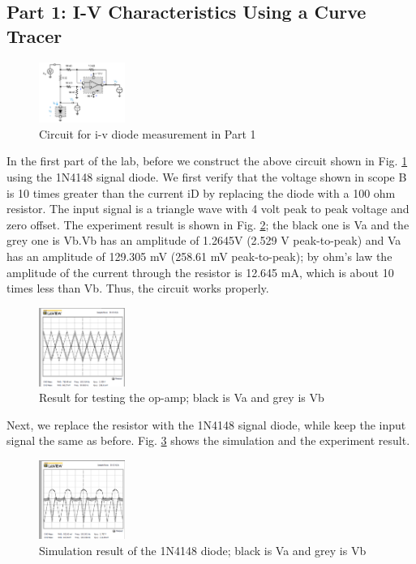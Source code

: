 \documentclass[letterpaper, 10 pt, conference]{ieeeconf}  %
\begin{document}
\subsection{Part 1: I-V Characteristics Using a Curve Tracer}
\begin{figure}[ht]
  \centering
  \includegraphics[width=0.25\textwidth]{images/Part1circuit.png}
  \caption{Circuit for i-v diode measurement in Part 1}
  \label{fig:1}
\end{figure}
\par In the first part of the lab, before we construct the above circuit shown in Fig. \ref{fig:1} using the 1N4148 signal diode. We first verify that the voltage shown in scope B is 10 times greater than the current iD by replacing the diode with a 100 ohm resistor. The input signal is a triangle wave with 4 volt peak to peak voltage and zero offset. The experiment result is shown in Fig. \ref{fig:2}; the black one is Va and the grey one is Vb.Vb has an amplitude of 1.2645V (2.529 V peak-to-peak) and Va has an amplitude of 129.305 mV (258.61 mV peak-to-peak); by ohm's law the amplitude of the current through the resistor is 12.645  mA, which is about 10 times less than Vb. Thus, the circuit works properly.
\begin{figure}[ht]
  \centering
  \includegraphics[width=0.25\textwidth]{images/result1.png}
  \caption{Result for testing the op-amp; black is Va and grey is Vb}
  \label{fig:2}
\end{figure}
\par Next, we replace the resistor with the 1N4148 signal diode, while keep the input signal the same as before. Fig. \ref{fig:3} shows the simulation and the experiment result.
\begin{figure}[ht]
  \centering
  \includegraphics[width=0.25\textwidth]{images/result2.png}
  \caption{Simulation result of the 1N4148 diode; black is Va and grey is Vb}
  \label{fig:3}
\end{figure}
\end{document}
